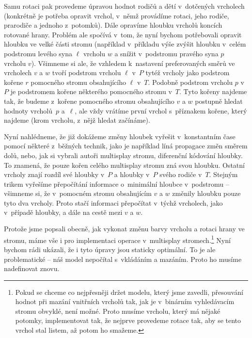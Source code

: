 Samu rotaci pak provedeme úpravou hodnot rodičů a dětí v~dotčených vrcholech
(konkrétně je potřeba opravit vrchol, v~němž provádíme rotaci, jeho rodiče,
prarodiče a jednoho z~potomků). Dále opravíme hloubku vrcholů koncích rotované hrany. Problém ale spočívá v~tom, že nyní bychom
potřebovali opravit hloubku ve velké části stromu (například v~příkladu výše
zvýšit hloubku v~celém podstromu levého syna $\ell$ vrcholu $w$ a snížit
v~podstromu pravého syna $p$ vrcholu $v$). Všimneme si ale, že vzhledem
k~nastavení preferovaných směrů ve vrcholech $v$ a $w$ tvoří podstrom vrcholu
$\ell$ v~$P$ tytéž vrcholy jako podstrom kořene $r$ pomocného stromu
obsahujícího $\ell$ v~$T$. Podobně podstrom vrcholu $p$ v~$P$ je podstromem
kořene některého pomocného stromu v~$T$. Tyto kořeny najdeme tak, že budeme
z~kořene pomocného stromu obsahujícího $v$ a $w$ postupně hledat hodnoty
vrcholů~$p$ a~$\ell$, ale vždy vrátíme první vrchol s~příznakem kořene, který
najdeme (krom vrcholu, z~nějž hledat začínáme).

Nyní nahlédneme, že již dokážeme změny hloubek vyřešit v~konstantním čase pomocí některé
z~běžných technik, jako je například líná propagace změn směrem dolů, nebo, jak si
vybrali autoři multisplay stromu, diferenční kódování hloubky. To znamená, že
pouze kořen celého multisplay stromu zná svou hloubku. Ostatní vrcholy znají
rozdíl své hloubky v~$P$ a hloubky v~$P$ svého rodiče v~$T$. Stejným trikem
vyřešíme přepočítání informace o~minimální hloubce v~podstromu -- všimneme si, že
v~pomocném stromu obsahujícím $v$ a $w$ změnily hloubku pouze tyto dva vrcholy.
Proto stačí informaci přepočítat v~týchž vrcholech, jako v~případě hloubky, a
dále na cestě mezi $v$ a $w$.

Protože jsme popsali obecně, jak vykonat změnu barvy vrcholu a rotaci hrany ve
stromu, máme vše i pro implementaci operace  v~multisplay
stromech.\footnote{Pokud se chceme co nejpřesněji držet modelu, který jsme
zavedli, přesouvání hodnot při mazání vnitřních vrcholů tak, jak je v~binárním
vyhledávacím stromu obvyklé, není možné. Proto musíme  vrcholu,
který má nějaké potomky, implementovat tak, že nejprve provedeme rotace tak,
aby se tento vrchol stal listem, až potom ho smažeme.} Nyní bychom rádi ukázali,
že i tyto úpravy jsou staticky optimální. To je ale problematické -- náš model
nepočítal s~vkládáním a mazáním. Proto ho musíme nadefinovat znovu.

